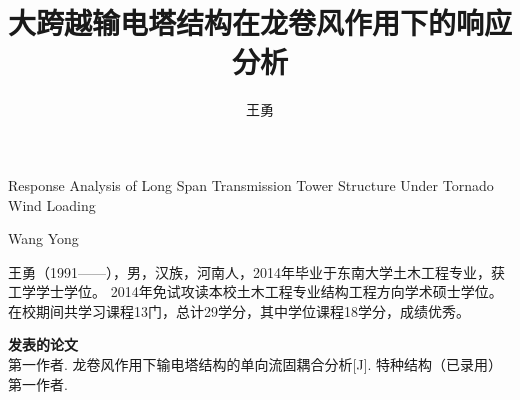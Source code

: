 \documentclass[algorithmlist,figurelist,tablelist,nomlist,masters]{seuthesix}
\begin{document}
\title{大跨越输电塔结构在龙卷风作用下的响应分析}{}{Response Analysis of Long Span Transmission Tower Structure Under Tornado Wind Loading}{}
\author{王勇}{Wang Yong}
\authorizedate{\today}
\committeechair{}
\reviewer{}{}
\seuthesisthanks{}

\makebigcover
\makecover



\tableofcontents

\mainmatter








\acknowledgement


\appendix


% 




王勇（1991——），男，汉族，河南人，2014年毕业于东南大学土木工程专业，获工学学士学位。
2014年免试攻读本校土木工程专业结构工程方向学术硕士学位。
在校期间共学习课程13门，总计29学分，其中学位课程18学分，成绩优秀。


\begin{flushleft}
{\bfseries \large 发表的论文}\\ \relax
[1] 第一作者. 龙卷风作用下输电塔结构的单向流固耦合分析[J]. 特种结构（已录用）
\\
[2] 第一作者. 
\end{flushleft}
\end{document}

